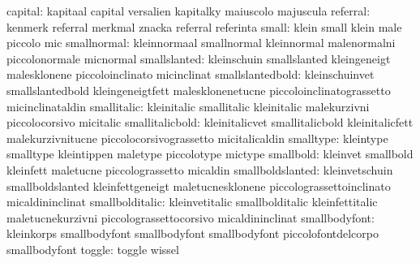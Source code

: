                   capital: kapitaal                  capital
                           versalien                 kapitalky
                           maiuscolo                 majuscula
                 referral: kenmerk                   referral
                           merkmal                   znacka
                           referral                  referinta
                    small: klein                     small
                           klein                     male
                           piccolo                   mic
              smallnormal: kleinnormaal              smallnormal
                           kleinnormal               malenormalni
                           piccolonormale            micnormal
             smallslanted: kleinschuin               smallslanted
                           kleingeneigt              malesklonene
                           piccoloinclinato          micinclinat
         smallslantedbold: kleinschuinvet            smallslantedbold
                           kleingeneigtfett          malesklonenetucne
                           piccoloinclinatograssetto micinclinataldin
              smallitalic: kleinitalic               smallitalic
                           kleinitalic               malekurzivni
                           piccolocorsivo            micitalic
          smallitalicbold: kleinitalicvet            smallitalicbold
                           kleinitalicfett           malekurzivnitucne
                           piccolocorsivograssetto   micitalicaldin
                smalltype: kleintype                 smalltype
                           kleintippen               maletype
                           piccolotype               mictype
                smallbold: kleinvet                  smallbold
                           kleinfett                 maletucne
                           piccolograssetto          micaldin
         smallboldslanted: kleinvetschuin            smallboldslanted
                           kleinfettgeneigt          maletucnesklonene
                           piccolograssettoinclinato micaldininclinat
          smallbolditalic: kleinvetitalic            smallbolditalic
                           kleinfettitalic           maletucnekurzivni
                           piccolograssettocorsivo   micaldininclinat
            smallbodyfont: kleinkorps                smallbodyfont
                           smallbodyfont             smallbodyfont
                           piccolofontdelcorpo       smallbodyfont %
                   toggle: toggle                    wissel
